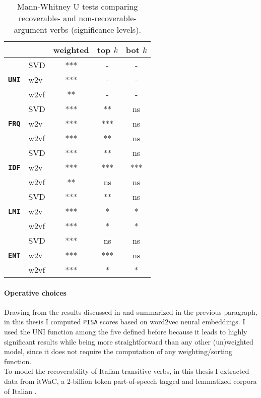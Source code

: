 \begin{table}
\caption{Mann-Whitney U tests comparing recoverable- and non-recoverable-argument verbs (significance levels).}
\centering
\begin{small}
\begin{tabular}{llccc}
\hline & & \textbf{weighted} & \textbf{top $k$} & \textbf{bot $k$} \\ \hline
 & SVD & *** & - & - \\
\texttt{\textbf{UNI}} & w2v & *** & - & - \\
 & w2vf & ** & - & - \\
 \hline
 & SVD & *** & ** & ns \\
\texttt{\textbf{FRQ}} & w2v & *** & *** & ns \\
 & w2vf & *** & ** & ns \\
 \hline
 & SVD & *** & ** & ns \\
\texttt{\textbf{IDF}} & w2v & *** & *** & *** \\
 & w2vf & ** & ns & ns \\
 \hline
 & SVD & *** & ** & ns \\
\texttt{\textbf{LMI}} & w2v & *** & * & * \\
 & w2vf & *** & * & * \\
 \hline
 & SVD & *** & ns & ns \\
\texttt{\textbf{ENT}} & w2v & *** & *** & ns \\
 & w2vf & *** & * & * \\
\hline
\end{tabular}
\end{small}
\end{table}

\paragraph{Operative choices}
Drawing from the results discussed in \textcite{CappelliLenciPISA} and summarized in the previous paragraph, in this thesis I computed \texttt{PISA} scores based on word2vec neural embeddings. I used the UNI function among the five defined before because it leads to highly significant results while being more straightforward than any other (un)weighted model, since it does not require the computation of any weighting/sorting function.\\
To model the recoverability of Italian transitive verbs, in this thesis I extracted data from itWaC, a 2-billion token part-of-speech tagged and lemmatized corpora of Italian \parencite{baroni2009wacky}.

